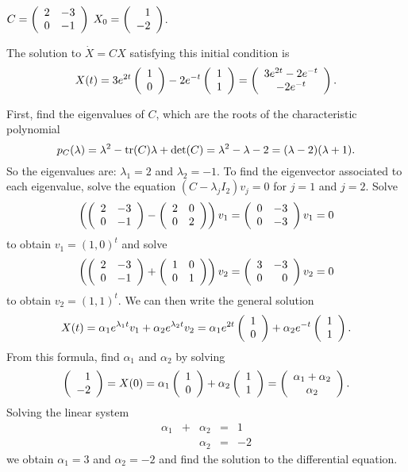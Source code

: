 \documentclass{ximera}
\begin{document}
\begin{exercise}  \label{c4.10A.1b}
$C = \left(\begin{array}{rr} 2 & -3\\ 0 &-1\end{array}\right)$ \AND $X_0 = \left(\begin{array}{r} 1 \\ -2\end{array}\right)$.

\begin{solution}
\ans The solution to $\dot{X} = CX$ satisfying this
initial condition is
\[
X(t) = 3e^{2t}\left(\begin{array}{r} 1 \\ 0\end{array}\right) - 2e^{-t}\left(\begin{array}{r} 1 \\ 1\end{array}\right)
= \left(\begin{array}{c} 3e^{2t} - 2e^{-t} \\ -2e^{-t}\end{array}\right).
\]

\soln First, find the eigenvalues of $C$, which are the roots of the
characteristic polynomial
\[
p_C(\lambda) = \lambda^2 - {\rm tr}(C)\lambda + \det(C) =
\lambda^2 - \lambda - 2 = (\lambda - 2)(\lambda + 1).
\]
So the eigenvalues are: $\lambda_1 = 2$ and $\lambda_2 = -1$.
To find the eigenvector associated to each eigenvalue, solve
the equation $(C - \lambda_jI_2)v_j = 0$ for $j = 1$ and $j = 2$.  Solve
\[
\left(\left(\begin{array}{rr} 2 & -3\\ 0 &-1\end{array}\right) - \left(\begin{array}{rr} 2 & 0\\ 0 &2\end{array}\right)\right)v_1 =
\left(\begin{array}{rr} 0 & -3\\ 0 &-3\end{array}\right)v_1 = 0
\]
to obtain $v_1 = (1,0)^t$ and solve
\[
\left(\left(\begin{array}{rr} 2 & -3\\ 0 &-1\end{array}\right) + \left(\begin{array}{rr} 1 & 0\\ 0 &1\end{array}\right)\right)v_2 =
\left(\begin{array}{rr} 3 & -3\\ 0 &0\end{array}\right)v_2 = 0
\]
to obtain $v_2 = (1,1)^t$.  We can then write the general solution
\[
X(t) = \alpha_1e^{\lambda_1 t}v_1 + \alpha_2e^{\lambda_2 t}v_2
= \alpha_1e^{2t}\left(\begin{array}{r} 1 \\ 0\end{array}\right) + \alpha_2e^{-t}\left(\begin{array}{r} 1 \\ 1\end{array}\right).
\]
From this formula, find $\alpha_1$ and $\alpha_2$ by solving
\[
\left(\begin{array}{r} 1 \\ -2\end{array}\right) = X(0) = \alpha_1\left(\begin{array}{r} 1 \\ 0\end{array}\right) + \alpha_2\left(\begin{array}{r} 1 \\ 1\end{array}\right) =
\left(\begin{array}{c} \alpha_1 + \alpha_2 \\ \alpha_2\end{array}\right).
\]
Solving the linear system
\[
\begin{array}{rrrrr}
\alpha_1 & + & \alpha_2 & = & 1 \\
& & \alpha_2 & = & -2
\end{array}
\]
we obtain $\alpha_1 = 3$ and $\alpha_2 = -2$ and find the
solution to the differential equation.


\end{solution}
\end{exercise}
\end{document}
